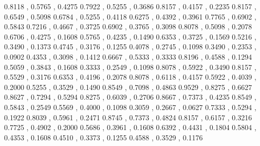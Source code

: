 \definecolor{akago}{rgb}	{	0.8118	,	0.5765	,	0.4275	}
\definecolor{tokigaracha}{rgb}	{	0.7922	,	0.5255	,	0.3686	}
\definecolor{otan}{rgb}	        {	0.8157	,	0.4157	,	0.2235	}
\definecolor{komugi}{rgb}	{	0.8157	,	0.6549	,	0.5098	}
\definecolor{rakuda}{rgb}	{	0.6784	,	0.5255	,	0.4118	}
\definecolor{tsurubami}{rgb}	{	0.6275	,	0.4392	,	0.3961	}
\definecolor{ama}{rgb}	        {	0.7765	,	0.6902	,	0.5843	}
\definecolor{nikkei}{rgb}	{	0.7216	,	0.4667	,	0.3725	}
\definecolor{renga}{rgb}	{	0.6902	,	0.3765	,	0.3098	}
\definecolor{sohi}{rgb}   	{	0.8078	,	0.5098	,	0.2078	}
\definecolor{enshucha}{rgb}	{	0.6706	,	0.4275	,	0.1608	}
\definecolor{karacha}{rgb}	{	0.5765	,	0.4235	,	0.1490	}
\definecolor{kabacha}{rgb}	{	0.6353	,	0.3725	,	0.1569	}
\definecolor{sodenkaracha}{rgb}	{	0.5216	,	0.3490	,	0.1373	}
\definecolor{suzumecha}{rgb}	{	0.4745	,	0.3176	,	0.1255	}
\definecolor{kurikawacha}{rgb}	{	0.4078	,	0.2745	,	0.1098	}
\definecolor{momoshiocha}{rgb}	{	0.3490	,	0.2353	,	0.0902	}
\definecolor{tobi}{rgb}	        {	0.4353	,	0.3098	,	0.1412	}
\definecolor{kurumizome}{rgb}	{	0.6667	,	0.5333	,	0.3333	}
\definecolor{kaba}{rgb}	        {	0.8196	,	0.4588	,	0.1294	}
\definecolor{korosen}{rgb}	{	0.5059	,	0.3843	,	0.1608	}
\definecolor{kogecha}{rgb}	{	0.3333	,	0.2549	,	0.1098	}
\definecolor{kokikuchinashi}{rgb}	{	0.8078	,	0.5922	,	0.3490	}
\definecolor{araigaki}{rgb}	{	0.8157	,	0.5529	,	0.3176	}
\definecolor{taisha}{rgb}	{	0.6353	,	0.4196	,	0.2078	}
\definecolor{akashirotsurubami}{rgb}	{	0.8078	,	0.6118	,	0.4157	}
\definecolor{tonocha}{rgb}	{	0.5922	,	0.4039	,	0.2000	}
\definecolor{sencha}{rgb}	{	0.5255	,	0.3529	,	0.1490	}
\definecolor{sharegaki}{rgb}	{	0.8549	,	0.7098	,	0.4863	}
\definecolor{ko}{rgb}	        {	0.9529	,	0.8275	,	0.6627	}
\definecolor{usugaki}{rgb}	{	0.8627	,	0.7294	,	0.5294	}
\definecolor{koji}{rgb}	        {	0.8275	,	0.6039	,	0.2706	}
\definecolor{umezome}{rgb}	{	0.8667	,	0.7373	,	0.4235	}
\definecolor{beniukon}{rgb}	{	0.8549	,	0.5843	,	0.2549	}
\definecolor{chojicha}{rgb}	{	0.5569	,	0.4000	,	0.1098	}
\definecolor{kenpozome}{rgb}	{	0.3059	,	0.2667	,	0.0627	}
\definecolor{biwacha}{rgb}	{	0.7333	,	0.5294	,	0.1922	}
\definecolor{kohaku}{rgb}	{	0.8039	,	0.5961	,	0.2471	}
\definecolor{usuko}{rgb}	{	0.8745	,	0.7373	,	0.4824	}
\definecolor{kuchiba}{rgb}	{	0.8157	,	0.6157	,	0.3216	}
\definecolor{kincha}{rgb}	{	0.7725	,	0.4902	,	0.2000	}
\definecolor{chozizome}{rgb}	{	0.5686	,	0.3961	,	0.1608	}
\definecolor{kitsune}{rgb}	{	0.6392	,	0.4431	,	0.1804	}
\definecolor{hushizome}{rgb}	{	0.5804	,	0.4353	,	0.1608	}
\definecolor{kyara}{rgb}	{	0.4510	,	0.3373	,	0.1255	}
\definecolor{susutake}{rgb}	{	0.4588	,	0.3529	,	0.1176	}

